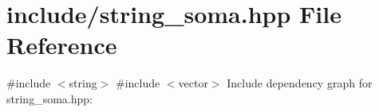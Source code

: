 \section{include/string\+\_\+soma.hpp File Reference}
\label{string__soma_8hpp}
{\ttfamily \#include $<$string$>$}\newline
{\ttfamily \#include $<$vector$>$}\newline
Include dependency graph for string\+\_\+soma.\+hpp\+:

